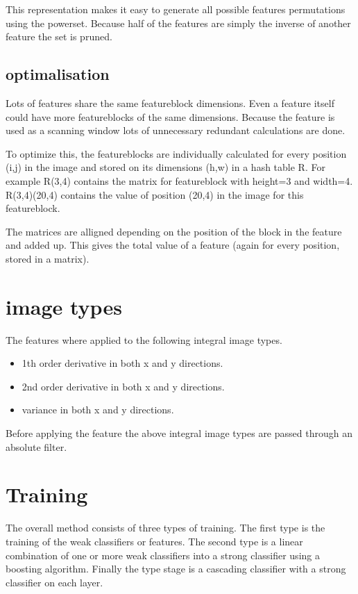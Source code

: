 \documentclass[a4paper,11pt]{article}
\begin{document}
	This representation makes it easy to generate all possible features
	permutations using the powerset.  Because half of the features are simply
	the inverse of another feature the set is pruned.

	\subsection{optimalisation}
	Lots of features share the same featureblock dimensions. Even a feature
	itself could have more featureblocks of the same dimensions.  Because the
	feature is used as a scanning window lots of unnecessary redundant
	calculations are done.

	To optimize this, the featureblocks are individually calculated for every
	position (i,j) in the image and stored on its dimensions (h,w) in a hash
	table R.  For example R(3,4) contains the matrix for featureblock with
	height=3 and width=4.  R(3,4)(20,4) contains the value of position (20,4) in
	the image for this featureblock.

	The matrices are alligned depending on the position of the block in the
	feature and added up. This gives the total value of a feature (again for
	every position, stored in a matrix).

	\section{image types}
	The features where applied to the following integral image types.
	\begin{itemize}
		\item{1th order derivative in both x and y directions.}
		\item{2nd order derivative in both x and y directions.}
		\item{variance in both x and y directions.}
	\end{itemize}
	Before applying the feature the above integral image types are passed through an absolute filter.


\section*{Training}
The overall method consists of three types of training. The first type is the
training of the weak classifiers or features. The second type is a linear
combination of one or more weak classifiers into a strong classifier using a
boosting algorithm. Finally the type stage is a cascading classifier with a
strong classifier on each layer.
\end{document}
